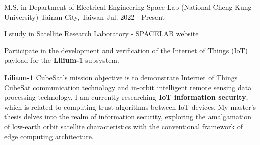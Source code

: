 

\begin{cventries}

  \cventry
    {M.S. in Department of Electrical Engineering}
    {Space Lab (National Cheng Kung University)}
    {Tainan City, Taiwan} %
    {Jul. 2022 - Present} %
    {
      \begin{cvitems} %
      \item {I study in Satellite Research Laboratory - \href{http://satellite.ncku.edu.tw/}{SPACELAB website}}
      \item {Participate in the development and verification of the Internet of Things (IoT) payload for the \textbf{Lilium-1} subsystem.}
      \newline
      \end{cvitems}
    }


\end{cventries}

\begin{cvparagraph}

\textbf{Lilium-1} CubeSat’s mission objective is to demonstrate Internet of Things CubeSat communication technology and in-orbit intelligent remote sensing data processing technology. I am currently researching \textbf{IoT information security}, which is related to computing trust algorithms between IoT devices. My master's thesis delves into the realm of information security, exploring the amalgamation of low-earth orbit satellite characteristics with the conventional framework of edge computing architecture.
\end{cvparagraph}
